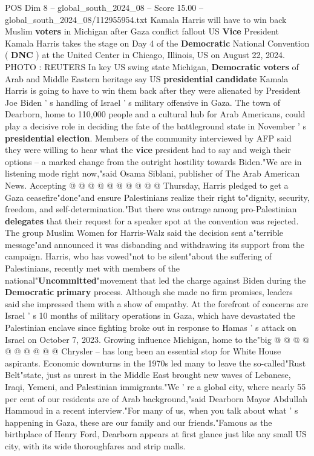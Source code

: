 \begin{textsample}{POS Dim 8 – global\_south\_2024\_08 – Score 15.00 – global\_south\_2024\_08/112955954.txt}  \label{ex:f8_pos_171}
Kamala Harris will have to win back Muslim \textbf{voters} in Michigan after Gaza conflict fallout US \textbf{Vice} President Kamala Harris takes the stage on Day 4 of the \textbf{Democratic} National Convention ( \textbf{DNC} ) at the United Center in Chicago, Illinois, US on August 22, 2024.
PHOTO : REUTERS In key US swing state Michigan, \textbf{Democratic} \textbf{voters} of Arab and Middle Eastern heritage say US \textbf{presidential} \textbf{candidate} Kamala Harris is going to have to win them back after they were alienated by President Joe Biden ' s handling of Israel ' s military offensive in Gaza.
The town of Dearborn, home to 110,000 people and a cultural hub for Arab Americans, could play a decisive role in deciding the fate of the battleground state in November ' s \textbf{presidential} \textbf{election}.
Members of the community interviewed by AFP said they were willing to hear what the \textbf{vice} president had to say and weigh their options -- a marked change from the outright hostility towards Biden."We are in listening mode right now,"said Osama Siblani, publisher of The Arab American News.
Accepting @ @ @ @ @ @ @ @ @ @ Thursday, Harris pledged to get a Gaza ceasefire"done"and ensure Palestinians realize their right to"dignity, security, freedom, and self-determination."But there was outrage among pro-Palestinian \textbf{delegates} that their request for a speaker spot at the convention was rejected.
The group Muslim Women for Harris-Walz said the decision sent a"terrible message"and announced it was disbanding and withdrawing its support from the campaign.
Harris, who has vowed"not to be silent"about the suffering of Palestinians, recently met with members of the national"\textbf{Uncommitted}"movement that led the charge against Biden during the \textbf{Democratic} \textbf{primary} process.
Although she made no firm promises, leaders said she impressed them with a show of empathy.
At the forefront of concerns are Israel ' s 10 months of military operations in Gaza, which have devastated the Palestinian enclave since fighting broke out in response to Hamas ' s attack on Israel on October 7, 2023.
Growing influence Michigan, home to the"big @ @ @ @ @ @ @ @ @ @ Chrysler -- has long been an essential stop for White House aspirants.
Economic downturns in the 1970s led many to leave the so-called"Rust Belt"state, just as unrest in the Middle East brought new waves of Lebanese, Iraqi, Yemeni, and Palestinian immigrants."We ' re a global city, where nearly 55 per cent of our residents are of Arab background,"said Dearborn Mayor Abdullah Hammoud in a recent interview."For many of us, when you talk about what ' s happening in Gaza, these are our family and our friends."Famous as the birthplace of Henry Ford, Dearborn appears at first glance just like any small US city, with its wide thoroughfares and strip malls.

\end{textsample}
